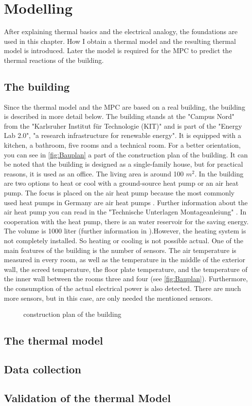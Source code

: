 \chapter{Modelling}
\label{ch:modelling}
After explaining thermal basics and the electrical analogy, the foundations are used in this chapter. How I obtain a thermal model and the resulting thermal model is introduced. Later the model is required for the MPC to predict the thermal reactions of the building. 

\section{The building}
\label{section:building}
Since the thermal model and the MPC are based on a real building, the building is described in more detail below.
\newline
The building stands at the "Campus Nord" from the "Karlsruher Institut für Technologie (KIT)" and is part of the "Energy Lab 2.0", "a research infrastructure for renewable energy"\cite{KIT.2021}. It is equipped with a kitchen, a bathroom, five rooms and a technical room. For a better orientation, you can see in \autoref{fig:Bauplan} a part of the construction plan of the building. It can be noted that the building is designed as a single-family house, but for practical reasons, it is used as an office. The living area is around 100 $m^2$. In the building are two options to heat or cool with a ground-source heat pump or an air heat pump. The focus is placed on the air heat pump because the most commonly used heat pumps in Germany are air heat pumps \cite{bwp.2021}. Further information about the air heat pump you can read in the "Technische Unterlagen Montageanleiung" \cite{TUM}. In cooperation with the heat pump, there is an water reservoir for the saving energy. The volume is 1000 liter (further information in \cite{Oskar}).However, the heating system is not completely installed. So heating or cooling is not possible actual. 
One of the main features of the building is the number of sensors. The air temperature is measured in every room, as well as the temperature in the middle of the exterior wall, the screed temperature, the floor plate temperature, and the temperature of the inner wall between the rooms three and four (see \autoref{fig:Bauplan}). Furthermore, the consumption of the actual electrical power is also detected. There are much more sensors, but in this case, are only needed the mentioned sensors. 
\begin{figure}
    \centering
    \def\svgwidth{320pt}
    
    \caption{construction plan of the building \cite{Bauplan}}
    \label{fig:Bauplan}
\end{figure}

\section{The thermal model}
\label{thermalmodel}

\section{Data collection}

\section{Validation of the thermal Model}
\label{validationthermalmodel}



